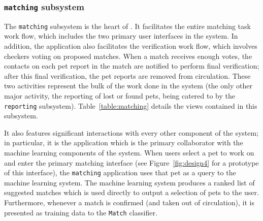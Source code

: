 \subsubsection {{\tt matching} subsystem}

The {\tt matching} subsystem is the heart of \nplh.  It facilitates the entire matching task work flow, which includes the two primary user interfaces in the system.  In addition, the application also facilitates the verification work flow, which involves checkers voting on proposed matches.  When a match receives enough votes, the contacts on each pet report in the match are notified to perform final verification; after this final verification, the pet reports are removed from circulation.  These two activities represent the bulk of the work done in the system (the only other major activity, the reporting of lost or found pets, being catered to by the {\tt reporting} subsystem).  Table~\ref{table:matching} details the views contained in this subsystem.

It also features significant interactions with every other component of the system; in particular, it is the application which is the primary collaborator with the machine learning components of the system.  When users select a pet to work on and enter the primary matching interface (see Figure~\ref{fig:design4} for a prototype of this interface), the {\tt matching} application uses that pet as a query to the machine learning system.  The machine learning system produces a ranked list of suggested matches which is used directly to output a selection of pets to the user.  Furthermore, whenever a match is confirmed (and taken out of circulation), it is presented as training data to the {\tt Match} classifier.

